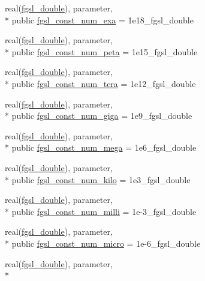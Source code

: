 \begin{DoxyCompactItemize}
\item 
real(\hyperlink{classfgsl_a9af5113378e0f000eb479d3f90196ddf}{fgsl\-\_\-double}), parameter, \\*
public \hyperlink{classfgsl_a0d6878f336ffcf4aaf3af66bbdfc5a9b}{fgsl\-\_\-const\-\_\-num\-\_\-exa} = 1e18\-\_\-fgsl\-\_\-double
\item 
real(\hyperlink{classfgsl_a9af5113378e0f000eb479d3f90196ddf}{fgsl\-\_\-double}), parameter, \\*
public \hyperlink{classfgsl_aa124eb86407291ed14158b0802d02029}{fgsl\-\_\-const\-\_\-num\-\_\-peta} = 1e15\-\_\-fgsl\-\_\-double
\item 
real(\hyperlink{classfgsl_a9af5113378e0f000eb479d3f90196ddf}{fgsl\-\_\-double}), parameter, \\*
public \hyperlink{classfgsl_a6b39aa71fe2d5af7fa748710f70afd58}{fgsl\-\_\-const\-\_\-num\-\_\-tera} = 1e12\-\_\-fgsl\-\_\-double
\item 
real(\hyperlink{classfgsl_a9af5113378e0f000eb479d3f90196ddf}{fgsl\-\_\-double}), parameter, \\*
public \hyperlink{classfgsl_a27758acec15033cf3c0918d8d9c55eca}{fgsl\-\_\-const\-\_\-num\-\_\-giga} = 1e9\-\_\-fgsl\-\_\-double
\item 
real(\hyperlink{classfgsl_a9af5113378e0f000eb479d3f90196ddf}{fgsl\-\_\-double}), parameter, \\*
public \hyperlink{classfgsl_a3783a70eb7db5888129ccf2094415129}{fgsl\-\_\-const\-\_\-num\-\_\-mega} = 1e6\-\_\-fgsl\-\_\-double
\item 
real(\hyperlink{classfgsl_a9af5113378e0f000eb479d3f90196ddf}{fgsl\-\_\-double}), parameter, \\*
public \hyperlink{classfgsl_a921e5869ad16238cb472943f2486d0ac}{fgsl\-\_\-const\-\_\-num\-\_\-kilo} = 1e3\-\_\-fgsl\-\_\-double
\item 
real(\hyperlink{classfgsl_a9af5113378e0f000eb479d3f90196ddf}{fgsl\-\_\-double}), parameter, \\*
public \hyperlink{classfgsl_a3fb5efe0ae67e7937ba05e8f184e2d35}{fgsl\-\_\-const\-\_\-num\-\_\-milli} = 1e-\/3\-\_\-fgsl\-\_\-double
\item 
real(\hyperlink{classfgsl_a9af5113378e0f000eb479d3f90196ddf}{fgsl\-\_\-double}), parameter, \\*
public \hyperlink{classfgsl_aa7d0f5804ffc72dc0ecddbee234cd51d}{fgsl\-\_\-const\-\_\-num\-\_\-micro} = 1e-\/6\-\_\-fgsl\-\_\-double
\item 
real(\hyperlink{classfgsl_a9af5113378e0f000eb479d3f90196ddf}{fgsl\-\_\-double}), parameter, \\*

\end{DoxyCompactItemize}
